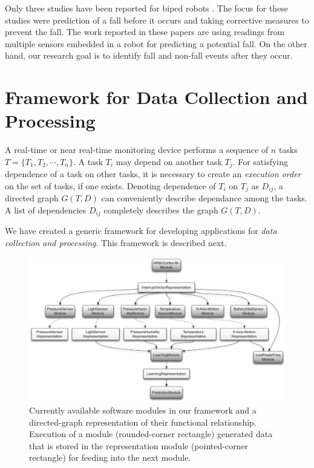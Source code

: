 \documentclass[]{IEEEtran}
\begin{document}
\par Only three studies have been reported for biped robots
\cite{Andre2015,Goswami2014,Moya2015}. The focus for these studies
were prediction of a fall before it occurs and taking corrective measures to
prevent the fall. The work reported in these papers are using readings from
multiple sensors embedded in a robot for predicting a potential fall. On the
other hand, our research goal is to identify  fall and non-fall events  after
they occur.

\section{Framework for Data Collection and Processing}
\label{sec:framework}

A real-time or near real-time monitoring device performs a sequence of $n$
tasks $T = \{ T_1, T_2,\cdots,T_n\}$. A task $T_i$ may depend on another task
$T_j$.  For satisfying dependence of a task on other tasks, it is necessary to
create an \emph{execution order} on the set of tasks, if one exists. Denoting
dependence of $T_i$ on $T_j$ as $D_{ij}$, a directed graph $G(T,D)$ can
conveniently describe dependance among the tasks. A list of dependencies
$D_{ij}$ completely describes the graph $G(T,D)$.  \par We have created a
generic framework for developing applications for \emph{data collection and
processing}. This framework is described next.

\begin{figure}[!t]
\centering
\includegraphics[width=.75\textwidth]{figures/graph_structure_def-crop3_bw.eps}
\caption{Currently available software modules in our framework and a directed-graph representation of their functional relationship. Execution of a module (rounded-corner rectangle) generated data that is stored in the representation module (pointed-corner rectangle) for feeding into the next module.}
 \label{fig:framework}
\end{figure}
\end{document}
